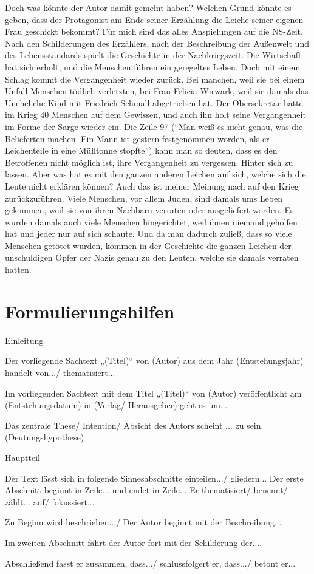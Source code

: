 Doch was könnte der Autor damit gemeint haben? Welchen Grund könnte es geben, dass der Protagonist am Ende seiner Erzählung die Leiche seiner eigenen Frau geschickt bekommt? Für mich sind das alles Anspielungen auf die NS-Zeit. Nach den Schilderungen des Erzählers, nach der Beschreibung der Außenwelt und des Lebensstandards spielt die Geschichte in der Nachkriegszeit. Die Wirtschaft hat sich erholt, und die Menschen führen ein geregeltes Leben. Doch mit einem Schlag kommt die Vergangenheit wieder zurück. Bei manchen, weil sie bei einem Unfall Menschen tödlich verletzten, bei Frau Felicia Wirwark, weil sie damals das Uneheliche Kind mit Friedrich Schmall abgetrieben hat. Der Obersekretär hatte im Krieg 40 Menschen auf dem Gewissen, und auch ihn holt seine Vergangenheit im Forme der Särge wieder ein. Die Zeile 97 (“Man weiß es nicht genau, was die Belieferten machen. Ein Mann ist gestern festgenommen worden, als er Leichenteile in eine Mülltonne stopfte”) kann man so deuten, dass es den Betroffenen nicht möglich ist, ihre Vergangenheit zu vergessen. Hinter sich zu lassen. Aber was hat es mit den ganzen anderen Leichen auf sich, welche sich die Leute nicht erklären können? Auch das ist meiner Meinung nach auf den Krieg zurückzuführen. 
Viele Menschen, vor allem Juden, sind damals ums Leben gekommen, weil sie von ihren Nachbarn verraten oder ausgeliefert worden. Es wurden damals auch viele Menschen hingerichtet, weil ihnen niemand geholfen hat und jeder nur auf sich schaute. Und da man dadurch zuließ, dass so viele Menschen getötet wurden, kommen in der Geschichte die ganzen Leichen der unschuldigen Opfer der Nazis genau zu den Leuten, welche sie damals verraten hatten.	 


\section{Formulierungshilfen}   
Einleitung
\begin{compactitem}
    \item Der vorliegende Sachtext „(Titel)“ von (Autor) aus dem Jahr (Entstehungsjahr) handelt von.../ thematisiert... 
    \item Im vorliegenden Sachtext mit dem Titel „(Titel)“ von (Autor) veröffentlicht am (Entstehungsdatum) in (Verlag/ Herausgeber) geht es um... 
    \item Das zentrale These/ Intention/ Absicht des Autors scheint ... zu sein. (Deutungshypothese) 
\end{compactitem}
Hauptteil
\begin{compactitem}
    \item Der Text lässt sich in folgende Sinnesabschnitte einteilen.../ gliedern... Der erste Abschnitt beginnt in Zeile... und endet in Zeile... Er thematisiert/ benennt/ zählt... auf/ fokussiert... 
    \item Zu Beginn wird beschrieben.../ Der Autor beginnt mit der Beschreibung... 
    \item Im zweiten Abschnitt fährt der Autor fort mit der Schilderung der.... 
    \item Abschließend fasst er zusammen, dass.../ schlussfolgert er, dass.../ betont er... 
\end{compactitem}

